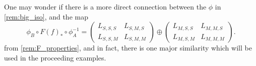 \begin{remark} \label{rem:phi_and_L_connection}
    One may wonder if there is a more direct connection between the \( \phi \) in \autoref{rem:big_iso}, and the map
    \[
        \phi_B \circ F(f)_* \circ \phi_A^{-1} =
        \begin{pmatrix}
            L_{S, S, S} & L_{S, M, S} \\
            L_{S, S, M } & L_{S, M, M}
        \end{pmatrix}
        \oplus
        \begin{pmatrix}
            L_{M, S, S} & L_{M, M, S} \\
            L_{M, S, M} & L_{M, M, M}
        \end{pmatrix}.
    \]
    from \autoref{rem:F_properties}, and in fact, there is one major similarity which will be used in the proceeding examples.


\end{remark}
